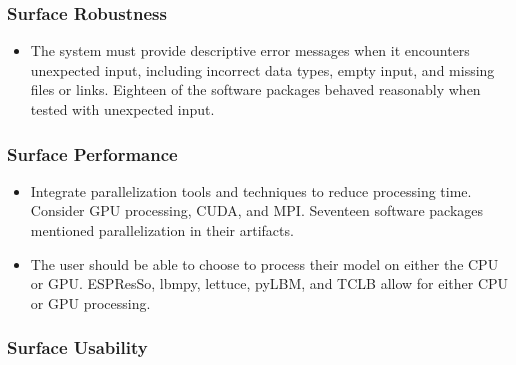 \documentclass[final, 3p, times, authoryear]{elsarticle}
\begin{document}
\subsubsection{Surface Robustness}

\begin{itemize}
	\item The system must provide descriptive error messages when it encounters
	unexpected input, including incorrect data types, empty input, and missing
	files or links. Eighteen of the software packages behaved reasonably when
	tested with unexpected input.
\end{itemize}

\subsubsection{Surface Performance}

\begin{itemize}
	\item Integrate parallelization tools and techniques to reduce processing
	time. Consider GPU processing, CUDA, and MPI. Seventeen software packages
	mentioned parallelization in their artifacts.
	\item The user should be able to choose to process their model on either the
	CPU or GPU. ESPResSo, lbmpy, lettuce, pyLBM, and TCLB allow for either CPU
	or GPU processing.
\end{itemize}

\subsubsection{Surface Usability}
\end{document}

